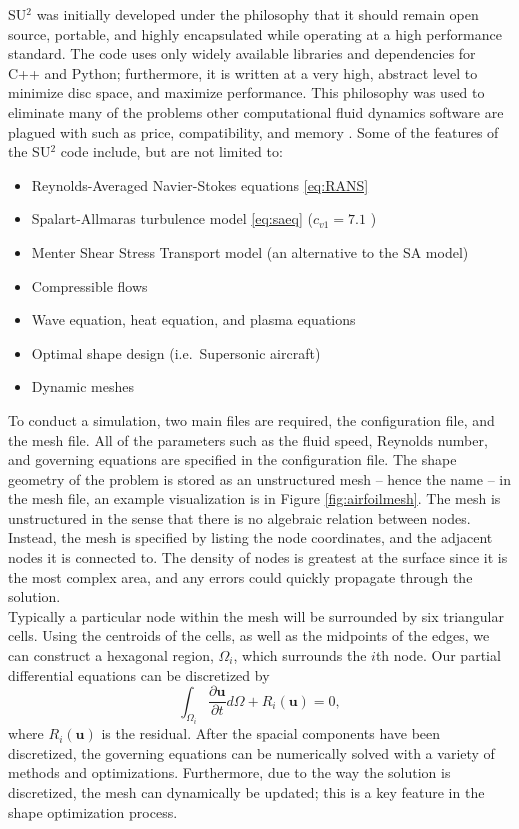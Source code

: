 \documentclass[10pt, titlepage]{article}
\begin{document}
SU$^2$ was initially developed under the philosophy that it should remain open source, portable, and highly encapsulated while operating at a high performance standard. The code uses only widely available libraries and dependencies for C++ and Python; furthermore, it is written at a very high, abstract level to minimize disc space, and maximize performance. This philosophy was used to eliminate many of the problems other computational fluid dynamics software are plagued with such as price, compatibility, and memory  \cite{su2main}. Some of the features of the SU$^2$ code include, but are not limited to:
\begin{itemize}
\item Reynolds-Averaged Navier-Stokes equations \eqref{eq:RANS}
\item Spalart-Allmaras turbulence model \eqref{eq:saeq} ($c_{v1} = 7.1$ \cite{su2main} \cite{su2two})
\item Menter Shear Stress Transport model (an alternative to the SA model)
\item Compressible flows
\item Wave equation, heat equation, and plasma equations
\item Optimal shape design (i.e.\ Supersonic aircraft)
\item Dynamic meshes \\
\end{itemize}

To conduct a simulation, two main files are required, the configuration file, and the mesh file. All of the parameters such as the fluid speed, Reynolds number, and governing equations are specified in the configuration file. The shape geometry of the problem is stored as an unstructured mesh -- hence the name -- in the mesh file, an example visualization is in Figure \ref{fig:airfoilmesh}. The mesh is unstructured in the sense that there is no algebraic relation between nodes. Instead, the mesh is specified by listing the node coordinates, and the adjacent nodes it is connected to. The density of nodes is greatest at the surface since it is the most complex area, and any errors could quickly propagate through the solution. \\

Typically a particular node within the mesh will be surrounded by six triangular cells. Using the centroids of the cells, as well as the midpoints of the edges, we can construct a hexagonal region, $\Omega_i$, which surrounds the $i$th node. Our partial differential equations can be discretized by 
\begin{equation*}
\int_{\Omega_i} \frac{\partial \mathbf{u}}{\partial t} d\Omega + R_i(\mathbf{u}) = 0,
\end{equation*}
where $R_i(\mathbf{u})$ is the residual. After the spacial components have been discretized, the governing equations can be numerically solved with a variety of methods and optimizations. Furthermore, due to the way the solution is discretized, the mesh can dynamically be updated; this is a key feature in the shape optimization process.
\end{document}
